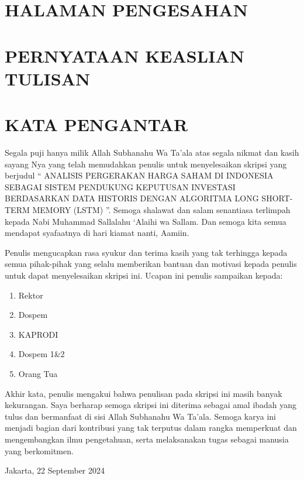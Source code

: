 \documentclass[12pt]{report}
\begin{document}
\chapter*{HALAMAN PENGESAHAN}
\pagebreak

\chapter*{PERNYATAAN KEASLIAN TULISAN}
\pagebreak

\chapter*{KATA PENGANTAR}
\vspace{0.5cm}
\indent

Segala puji hanya milik Allah Subhanahu Wa Ta’ala atas segala nikmat dan kasih sayang Nya yang telah memudahkan penulis untuk menyelesaikan skripsi yang berjudul “ ANALISIS PERGERAKAN HARGA SAHAM DI INDONESIA SEBAGAI SISTEM PENDUKUNG KEPUTUSAN INVESTASI BERDASARKAN DATA HISTORIS DENGAN ALGORITMA LONG SHORT-TERM MEMORY (LSTM) ”. Semoga shalawat dan salam senantiasa terlimpah kepada Nabi Muhammad Sallalahu ‘Alaihi wa Sallam. Dan semoga kita semua mendapat syafaatnya di hari kiamat nanti, Aamiin.
\vspace{0.5cm}

Penulis mengucapkan rasa syukur dan terima kasih yang tak terhingga kepada semua pihak-pihak yang selalu memberikan bantuan dan motivasi kepada penulis untuk dapat menyelesaikan skripsi ini. Ucapan ini penulis sampaikan kepada:

\begin{enumerate}
	\item Rektor
	\item Dospem
	\item KAPRODI
	\item Dospem 1\&2
	\item Orang Tua
\end{enumerate}

Akhir kata, penulis mengakui bahwa penulisan pada skripsi ini masih banyak kekurangan. Saya berharap semoga skripsi ini diterima sebagai amal ibadah yang tulus dan bermanfaat di sisi Allah Subhanahu Wa Ta’ala. Semoga karya ini menjadi bagian dari kontribusi yang tak terputus dalam rangka memperkuat dan mengembangkan ilmu pengetahuan, serta melaksanakan tugas sebagai manusia yang berkomitmen.

\vfill
{\raggedleft
	Jakarta, 22 September 2024
	\par}
\pagebreak
\end{document}
